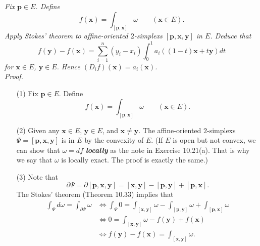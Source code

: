 \documentclass{article}
\begin{document}
\emph{Fix $\mathbf{p} \in E$.
Define
\[
  f(\mathbf{x}) = \int_{[\mathbf{p},\mathbf{x}]} \omega
  \qquad
  (\mathbf{x} \in E).
\]
Apply Stokes' theorem to affine-oriented $2$-simplexs $[\mathbf{p},\mathbf{x},\mathbf{y}]$ in $E$.
Deduce that
\[
  f(\mathbf{y}) - f(\mathbf{x})
  = \sum_{i=1}^{n}(y_i - x_i) \int_{0}^{1} a_i((1-t)\mathbf{x} + t\mathbf{y}) dt
\]
for $\mathbf{x} \in E$, $\mathbf{y} \in E$.
Hence $(D_i f)(\mathbf{x}) = a_i(\mathbf{x})$.} \\



\emph{Proof.}
\begin{enumerate}
\item[(1)]
  Fix $\mathbf{p} \in E$.
  Define
  \[
    f(\mathbf{x}) = \int_{[\mathbf{p},\mathbf{x}]} \omega
    \qquad
    (\mathbf{x} \in E).
  \]

\item[(2)]
  Given any $\mathbf{x} \in E$, $\mathbf{y} \in E$, and $\mathbf{x} \neq \mathbf{y}$.
  The affine-oriented $2$-simplexs $\Psi = [\mathbf{p},\mathbf{x},\mathbf{y}]$ is in $E$
  by the convexity of $E$.
  (If $E$ is open but not convex,
  we can show that $\omega = df$ \textbf{\emph{locally}} as the note in Exercise 10.21(a).
  That is why we say that $\omega$ is locally exact.
  The proof is exactly the same.)

\item[(3)]
  Note that
  \[
    \partial \Psi
    = \partial [\mathbf{p},\mathbf{x},\mathbf{y}]
    = [\mathbf{x},\mathbf{y}] - [\mathbf{p},\mathbf{y}] + [\mathbf{p},\mathbf{x}].
  \]
  The Stokes' theorem (Theorem 10.33) implies that
  \begin{align*}
    \int_{\Psi} d\omega
    = \int_{\partial \Psi} \omega
    &\Longleftrightarrow
    \int_{\Psi} 0
    = \int_{[\mathbf{x},\mathbf{y}]} \omega
      - \int_{[\mathbf{p},\mathbf{y}]} \omega
      + \int_{[\mathbf{p},\mathbf{x}]} \omega \\
    &\Longleftrightarrow
    0 = \int_{[\mathbf{x},\mathbf{y}]} \omega - f(\mathbf{y}) + f(\mathbf{x}) \\
    &\Longleftrightarrow
    f(\mathbf{y}) - f(\mathbf{x}) = \int_{[\mathbf{x},\mathbf{y}]} \omega.
  \end{align*}


\end{enumerate}
\end{document}
